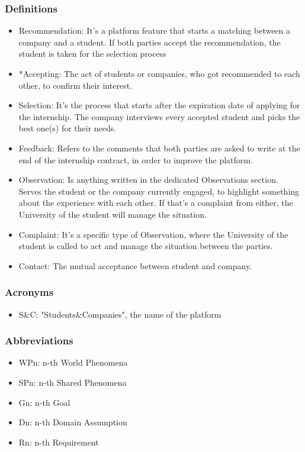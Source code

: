 \documentclass{article}
\begin{document}
\subsubsection{Definitions}
    \begin{itemize}
        \item Recommendation: It's a platform feature that starts a matching between a company and a student. If both parties accept the recommendation, the student is taken for the selection process
        \item *Accepting: The act of students or companies, who got recommended to each other, to confirm their interest. 
        \item Selection: It's the process that starts after the expiration date of applying for the internship. The company interviews every accepted student and picks the best one(s) for their needs. 
        \item Feedback: Refers to the comments that both parties are asked to write at the end of the internship contract, in order to improve the platform.
        \item Observation: Is anything written in the dedicated Observations section. Serves the student or the company currently engaged, to highlight something about the experience with each other. If that's a complaint from either, the University of the student will manage the situation.
        \item Complaint: It's a specific type of Observation, where the University of the student is called to act and manage the situation between the parties.
        \item Contact: The mutual acceptance between student and company.
    \end{itemize}
\subsubsection{Acronyms}
    \begin{itemize}
        \item S\&C: "Students&Companies", the name of the platform
    \end{itemize}
\subsubsection{Abbreviations}
    \begin{itemize}
        \item WPn: n-th World Phenomena
        \item SPn: n-th Shared Phenomena
        \item Gn: n-th Goal
        \item Dn: n-th Domain Assumption
        \item Rn: n-th Requirement
    \end{itemize}
\end{document}
